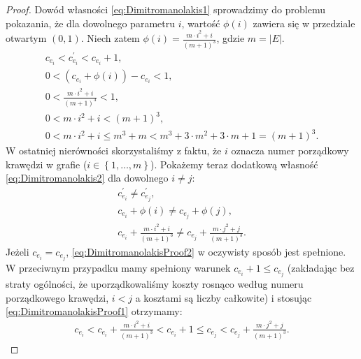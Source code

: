 \begin{proof}
	Dowód własności \ref{eq:Dimitromanolakis1} sprowadzimy do problemu pokazania, że dla dowolnego parametru $i$, wartość $\phi \left( i \right)$ zawiera się w przedziale otwartym $\left( 0, 1 \right)$. Niech zatem $\phi \left( i \right) = \frac{m \cdot i^{2} + i}{\left( m + 1 \right)^{3}}$, gdzie $m = \left| E \right|$.
	\begin{gather}
		c_{e_{i}} < c^{\prime}_{e_{i}} < c_{e_{i}} + 1\text{,}\nonumber\\
		0 < \left( c_{e_{i}} + \phi \left( i \right) \right) - c_{e_{i}} < 1\text{,}\nonumber\\
		0 < \frac{m \cdot i^{2} + i}{\left( m + 1 \right)^{3}} < 1\text{,}\label{eq:DimitromanolakisProof1}\\
		0 < m \cdot i^{2} + i < \left( m + 1 \right)^{3}\text{,}\nonumber\\
		0 < m \cdot i^{2} + i \leqslant m^{3} + m < m^{3} + 3 \cdot m^2 + 3 \cdot m + 1 = \left( m + 1 \right)^{3}\nonumber\text{.}
	\end{gather}
	W ostatniej nierówności skorzystaliśmy z faktu, że $i$ oznacza numer porządkowy krawędzi w grafie ($i \in \left\{ 1, \dots, m \right\}$). Pokażemy teraz dodatkową własność \ref{eq:Dimitromanolakis2} dla dowolnego $i \neq j$:
	\begin{gather}
		c^{\prime}_{e_{i}} \neq c^{\prime}_{e_{j}}\text{,}\nonumber\\
		c_{e_{i}} + \phi \left( i \right) \neq c_{e_{j}} + \phi \left( j \right)\text{,}\nonumber\\
		c_{e_{i}} + \frac{m \cdot i^{2} + i}{\left( m + 1 \right)^{3}} \neq c_{e_{j}} + \frac{m \cdot j^{2} + j}{\left( m + 1 \right)^{3}}\text{.}\label{eq:DimitromanolakisProof2}
	\end{gather}
	Jeżeli $c_{e_{i}} = c_{e_{j}}$, \ref{eq:DimitromanolakisProof2} w oczywisty sposób jest spełnione. W przeciwnym przypadku mamy spełniony warunek $c_{e_{i}} + 1 \leqslant c_{e_{j}}$ (zakładając bez straty ogólności, że uporządkowaliśmy koszty rosnąco według numeru porządkowego krawędzi, $i < j$ a kosztami są liczby całkowite) i stosując \ref{eq:DimitromanolakisProof1} otrzymamy:
	\begin{gather*}
		c_{e_{i}} < c_{e_{i}} + \frac{m \cdot i^{2} + i}{\left( m + 1 \right)^{3}} < c_{e_{i}} + 1 \leqslant c_{e_{j}} < c_{e_{j}} + \frac{m \cdot j^{2} + j}{\left( m + 1 \right)^{3}}\text{.}
	\end{gather*}
\end{proof}

